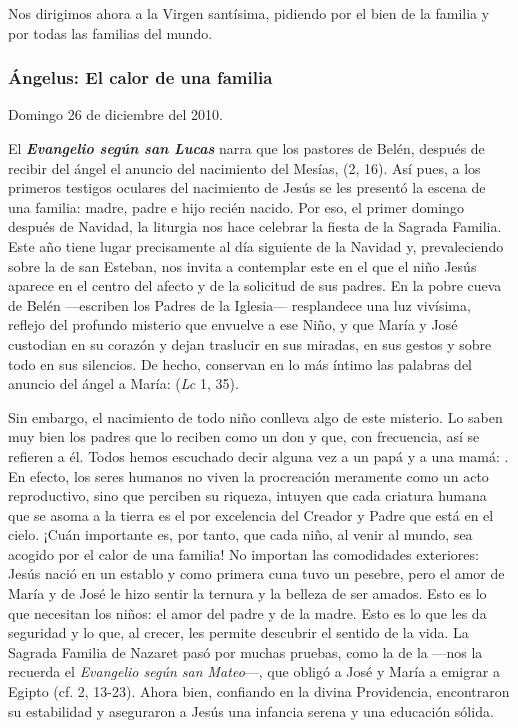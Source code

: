 \begin{body}
\begin{body}
Nos dirigimos ahora a la Virgen santísima, pidiendo por el bien de la familia y por todas las familias del mundo.

\subsubsection{Ángelus: El calor de una familia}

Domingo 26 de diciembre del 2010.

El \emph{\textbf{Evangelio según san Lucas}} narra que los pastores de Belén, después de recibir del ángel el anuncio del nacimiento del Mesías,  (2, 16). Así pues, a los primeros testigos oculares del nacimiento de Jesús se les presentó la escena de una familia: madre, padre e hijo recién nacido. Por eso, el primer domingo después de Navidad, la liturgia nos hace celebrar la fiesta de la Sagrada Familia. Este año tiene lugar precisamente al día siguiente de la Navidad y, prevaleciendo sobre la de san Esteban, nos invita a contemplar este  en el que el niño Jesús aparece en el centro del afecto y de la solicitud de sus padres. En la pobre cueva de Belén ---escriben los Padres de la Iglesia--- resplandece una luz vivísima, reflejo del profundo misterio que envuelve a ese Niño, y que María y José custodian en su corazón y dejan traslucir en sus miradas, en sus gestos y sobre todo en sus silencios. De hecho, conservan en lo más íntimo las palabras del anuncio del ángel a María:  (\emph{Lc} 1, 35).

Sin embargo, el nacimiento de todo niño conlleva algo de este misterio. Lo saben muy bien los padres que lo reciben como un don y que, con frecuencia, así se refieren a él. Todos hemos escuchado decir alguna vez a un papá y a una mamá: . En efecto, los seres humanos no viven la procreación meramente como un acto reproductivo, sino que perciben su riqueza, intuyen que cada criatura humana que se asoma a la tierra es el  por excelencia del Creador y Padre que está en el cielo. ¡Cuán importante es, por tanto, que cada niño, al venir al mundo, sea acogido por el calor de una familia! No importan las comodidades exteriores: Jesús nació en un establo y como primera cuna tuvo un pesebre, pero el amor de María y de José le hizo sentir la ternura y la belleza de ser amados. Esto es lo que necesitan los niños: el amor del padre y de la madre. Esto es lo que les da seguridad y lo que, al crecer, les permite descubrir el sentido de la vida. La Sagrada Familia de Nazaret pasó por muchas pruebas, como la de la  ---nos la recuerda el \emph{Evangelio según san Mateo}---, que obligó a José y María a emigrar a Egipto (cf. 2, 13-23). Ahora bien, confiando en la divina Providencia, encontraron su estabilidad y aseguraron a Jesús una infancia serena y una educación sólida.


\end{body}
\end{body}
